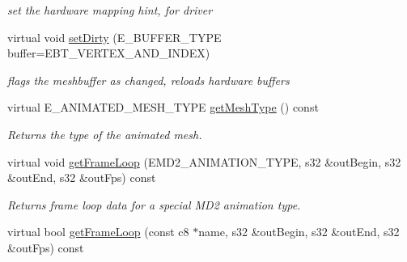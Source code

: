 \begin{DoxyCompactItemize}
\begin{DoxyCompactList}\small\item\em set the hardware mapping hint, for driver \end{DoxyCompactList}\item 
\hypertarget{classirr_1_1scene_1_1_c_animated_mesh_m_d2_a7bc94633a447b59123219f3065009988}{virtual void \hyperlink{classirr_1_1scene_1_1_c_animated_mesh_m_d2_a7bc94633a447b59123219f3065009988}{set\-Dirty} (E\-\_\-\-B\-U\-F\-F\-E\-R\-\_\-\-T\-Y\-P\-E buffer=E\-B\-T\-\_\-\-V\-E\-R\-T\-E\-X\-\_\-\-A\-N\-D\-\_\-\-I\-N\-D\-E\-X)}\label{classirr_1_1scene_1_1_c_animated_mesh_m_d2_a7bc94633a447b59123219f3065009988}

\begin{DoxyCompactList}\small\item\em flags the meshbuffer as changed, reloads hardware buffers \end{DoxyCompactList}\item 
\hypertarget{classirr_1_1scene_1_1_c_animated_mesh_m_d2_aaa6bf3529f6b0cf8e9aa6acb91f56c21}{virtual E\-\_\-\-A\-N\-I\-M\-A\-T\-E\-D\-\_\-\-M\-E\-S\-H\-\_\-\-T\-Y\-P\-E \hyperlink{classirr_1_1scene_1_1_c_animated_mesh_m_d2_aaa6bf3529f6b0cf8e9aa6acb91f56c21}{get\-Mesh\-Type} () const }\label{classirr_1_1scene_1_1_c_animated_mesh_m_d2_aaa6bf3529f6b0cf8e9aa6acb91f56c21}

\begin{DoxyCompactList}\small\item\em Returns the type of the animated mesh. \end{DoxyCompactList}\item 
\hypertarget{classirr_1_1scene_1_1_c_animated_mesh_m_d2_a9952da7a0601db45bf9177605786602b}{virtual void \hyperlink{classirr_1_1scene_1_1_c_animated_mesh_m_d2_a9952da7a0601db45bf9177605786602b}{get\-Frame\-Loop} (E\-M\-D2\-\_\-\-A\-N\-I\-M\-A\-T\-I\-O\-N\-\_\-\-T\-Y\-P\-E, s32 \&out\-Begin, s32 \&out\-End, s32 \&out\-Fps) const }\label{classirr_1_1scene_1_1_c_animated_mesh_m_d2_a9952da7a0601db45bf9177605786602b}

\begin{DoxyCompactList}\small\item\em Returns frame loop data for a special M\-D2 animation type. \end{DoxyCompactList}\item 
\hypertarget{classirr_1_1scene_1_1_c_animated_mesh_m_d2_a062bef94a592ab1f1cacb6d79d04a564}{virtual bool \hyperlink{classirr_1_1scene_1_1_c_animated_mesh_m_d2_a062bef94a592ab1f1cacb6d79d04a564}{get\-Frame\-Loop} (const c8 $\ast$name, s32 \&out\-Begin, s32 \&out\-End, s32 \&out\-Fps) const }\label{classirr_1_1scene_1_1_c_animated_mesh_m_d2_a062bef94a592ab1f1cacb6d79d04a564}


\end{DoxyCompactItemize}
